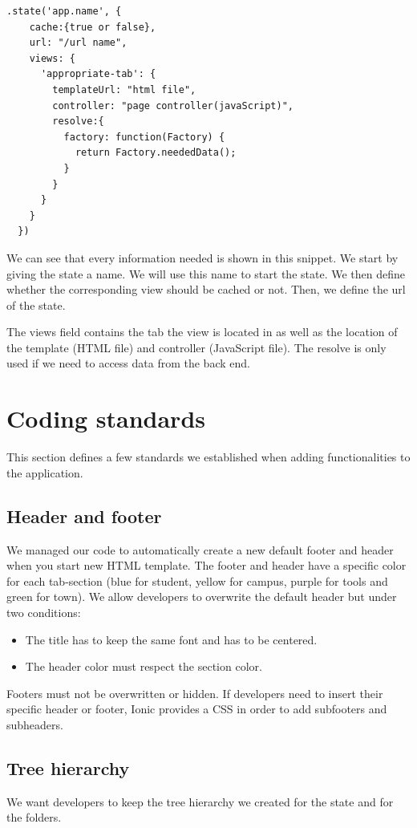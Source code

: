 \documentclass{eplmastersthesis}
\begin{document}
\begin{lstlisting}
.state('app.name', {
    cache:{true or false},
    url: "/url name",
    views: {
      'appropriate-tab': {
        templateUrl: "html file",
        controller: "page controller(javaScript)",
        resolve:{
          factory: function(Factory) {
            return Factory.neededData();
          }
        }
      }
    }
  })
\end{lstlisting}

We can see that every information needed is shown in this snippet. We start by giving the state a name. We will use this name to start the state. We then define whether the corresponding view should be cached or not. Then, we define the url of the state.

The views field contains the tab the view is located in as well as the location of the template (HTML file) and controller (JavaScript file).
The resolve is only used if we need to access data from the back end. 

\section{Coding standards}

This section defines a few standards we established when adding functionalities to the application. 

\subsection{Header and footer}
We managed our code to automatically create a new default footer and header when you start new HTML template. The footer and header have a specific color for each tab-section (blue for student, yellow for campus, purple for tools and green for town). We allow developers to overwrite the default header but under two conditions:
\begin{itemize}
\item The title has to keep the same font and has to be centered.
\item The header color must respect the section color.
\end{itemize}
Footers must not be overwritten or hidden. If developers need to insert their specific header or footer, Ionic provides a CSS in order to add subfooters and subheaders.
\subsection{Tree hierarchy}
We want developers to keep the tree hierarchy we created for the state and for the folders. 
\end{document}
